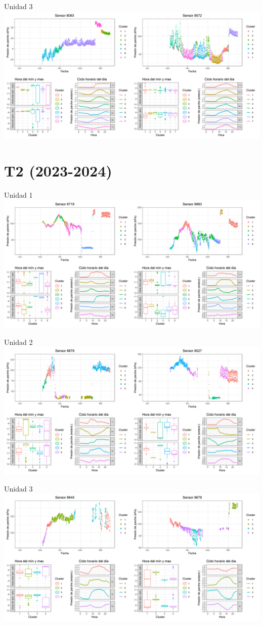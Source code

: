 \documentclass[
  letterpaper,
  DIV=11,
  numbers=noendperiod]{scrreprt}
\begin{document}
Unidad 3
\includegraphics{figuras/01_turgor_sensor/2023_2024_Rio_Claro_T1_Unidad_3.png}

\chapter{T2 (2023-2024)}

Unidad 1
\includegraphics{figuras/01_turgor_sensor/2023_2024_Rio_Claro_T2_Unidad_1.png}

Unidad 2
\includegraphics{figuras/01_turgor_sensor/2023_2024_Rio_Claro_T2_Unidad_2.png}

Unidad 3
\includegraphics{figuras/01_turgor_sensor/2023_2024_Rio_Claro_T2_Unidad_3.png}
\end{document}
